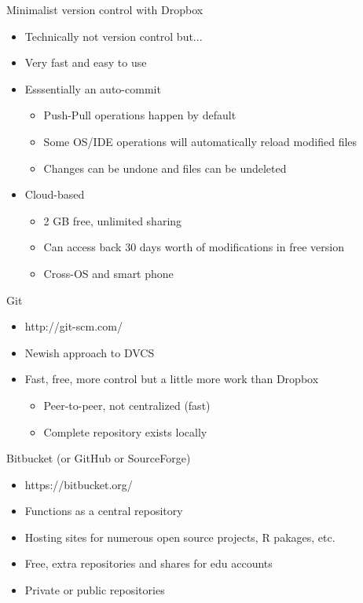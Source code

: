 \begin{frame}[t,fragile]{Minimalist version control with Dropbox}
\begin{itemize}
\item Technically not version control but...
\item Very fast and easy to use
\item Esssentially an auto-commit
	\begin{itemize}
	\item{Push-Pull operations happen by default}
	\item{Some OS/IDE operations will automatically reload modified files}
	\item{Changes can be undone and files can be undeleted}
	\end{itemize}
\item Cloud-based
  \begin{itemize}
  \item{2 GB free, unlimited sharing}
    \item{Can access back 30 days worth of modifications in free version}
    \item{Cross-OS and smart phone}
  \end{itemize}
\end{itemize}
\end{frame}

\begin{frame}[t,fragile]{Git}
\begin{itemize}
\item http://git-scm.com/
\item Newish approach to DVCS
\item Fast, free, more control but a little more work than Dropbox
  \begin{itemize}
  \item Peer-to-peer, not centralized (fast)
  \item Complete repository exists locally
  \end{itemize}
\end{itemize}
\end{frame}

\begin{frame}[t,fragile]{Bitbucket (or GitHub or SourceForge)}
\begin{itemize}
\item https://bitbucket.org/
\item Functions as a central repository
\item Hosting sites for numerous open source projects, R pakages, etc.
\item Free, extra repositories and shares for edu accounts
\item Private or public repositories
\end{itemize}
\end{frame}

